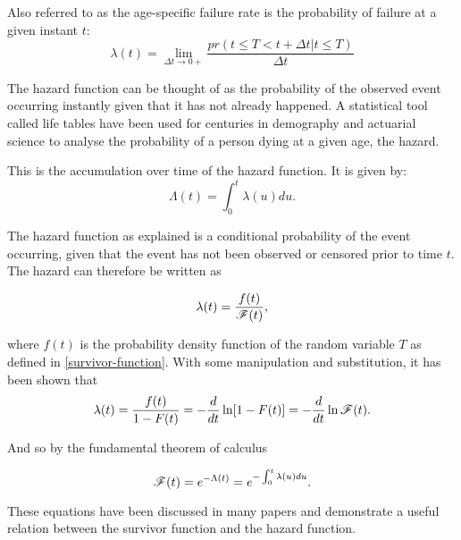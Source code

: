 \begin{definition}
Also referred to as the age-specific failure rate is the probability of failure at a given instant $t$:
\begin{equation}
    \lambda(t)=\lim_{\Delta t \xrightarrow{} 0+}\frac{pr(t\leq T < t+\Delta t | t\leq T)}{\Delta t}
\end{equation}
\end{definition}

The hazard function can be thought of as the probability of the observed event occurring instantly given that it has not already happened. A statistical tool called life tables have been used for centuries in demography and actuarial science to analyse the probability of a person dying at a given age, the hazard.

\begin{definition}
This is the accumulation over time of the hazard function. It is given by:
\begin{equation}
    \Lambda(t)=\int_0^t \lambda(u)du.
\end{equation}
\end{definition}

The hazard function as explained is a conditional probability of the event occurring, given that the event has not been observed or censored prior to time $t$. The hazard can therefore be written as

\begin{equation}\label{hazard-function}
    \lambda(t) = \frac{f(t)}{\mathscr{F}(t)},
\end{equation}

where $f(t)$ is the probability density function of the random variable $T$ as defined in \ref{survivor-function}. With some manipulation and substitution, it has been shown that
\begin{equation}
    \lambda(t) = \frac{f(t)}{1-F(t)}
    = -\frac{d}{dt}\ln[1-F(t)]
    = -\frac{d}{dt}\ln\mathscr{F}(t).
\end{equation}

And so by the fundamental theorem of calculus

\begin{equation}
    \mathscr{F}(t) = e^{-\Lambda(t)}=e^{-\int_0^t\lambda(u)du}.
\end{equation}

These equations have been discussed in many papers and demonstrate a useful relation between the survivor function and the hazard function.

